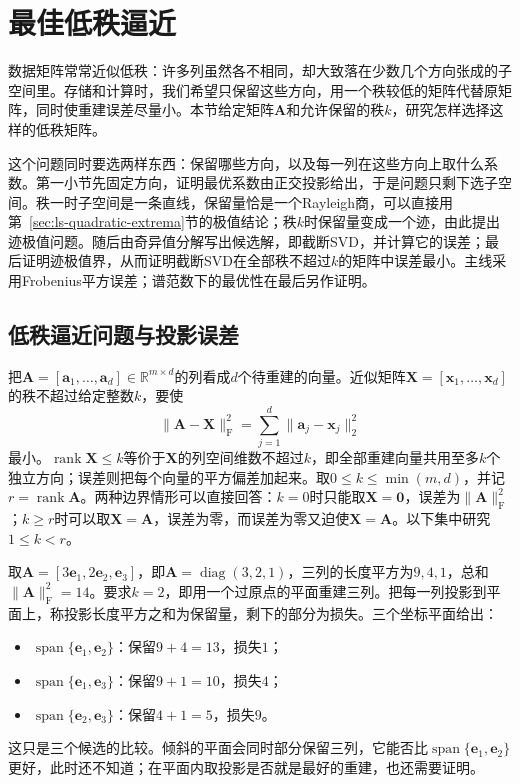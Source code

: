
\section{最佳低秩逼近}
\label{sec:ls-low-rank-approximation}
\label{sec:ls-low-rank-solve}
\label{sec:ls-full-svd-solve}
\label{sec:matrix-analysis-svd-low-rank}

数据矩阵常常近似低秩：许多列虽然各不相同，却大致落在少数几个方向张成的子空间里。存储和计算时，我们希望只保留这些方向，用一个秩较低的矩阵代替原矩阵，同时使重建误差尽量小。本节给定矩阵$\bm A$和允许保留的秩$k$，研究怎样选择这样的低秩矩阵。

这个问题同时要选两样东西：保留哪些方向，以及每一列在这些方向上取什么系数。第一小节先固定方向，证明最优系数由正交投影给出，于是问题只剩下选子空间。秩一时子空间是一条直线，保留量恰是一个Rayleigh商，可以直接用第~\ref{sec:ls-quadratic-extrema}节的极值结论；秩$k$时保留量变成一个迹，由此提出迹极值问题。随后由奇异值分解写出候选解，即截断SVD，并计算它的误差；最后证明迹极值界，从而证明截断SVD在全部秩不超过$k$的矩阵中误差最小。主线采用Frobenius平方误差；谱范数下的最优性在最后另作证明。

\subsection{低秩逼近问题与投影误差}
\label{sec:ls-low-rank-projection-error}

把$\bm A=[\bm a_1,\ldots,\bm a_d]\in\mathbb R^{m\times d}$的列看成$d$个待重建的向量。近似矩阵$\bm X=[\bm x_1,\ldots,\bm x_d]$的秩不超过给定整数$k$，要使
\[
 \lVert\bm A-\bm X\rVert_{\mathrm F}^2=\sum_{j=1}^d\lVert\bm a_j-\bm x_j\rVert_2^2
\]
最小。$\operatorname{rank}\bm X\leq k$等价于$\bm X$的列空间维数不超过$k$，即全部重建向量共用至多$k$个独立方向；误差则把每个向量的平方偏差加起来。取$0\leq k\leq\min(m,d)$，并记$r=\operatorname{rank}\bm A$。两种边界情形可以直接回答：$k=0$时只能取$\bm X=\bm0$，误差为$\lVert\bm A\rVert_{\mathrm F}^2$；$k\geq r$时可以取$\bm X=\bm A$，误差为零，而误差为零又迫使$\bm X=\bm A$。以下集中研究$1\leq k<r$。

\begin{example}[三个坐标向量的重建]
\label{ex:ls-low-rank-three-columns}
取$\bm A=[3\bm e_1,2\bm e_2,\bm e_3]$，即$\bm A=\operatorname{diag}(3,2,1)$，三列的长度平方为$9,4,1$，总和$\lVert\bm A\rVert_{\mathrm F}^2=14$。要求$k=2$，即用一个过原点的平面重建三列。把每一列投影到平面上，称投影长度平方之和为保留量，剩下的部分为损失。三个坐标平面给出：
\begin{itemize}
 \item $\operatorname{span}\{\bm e_1,\bm e_2\}$：保留$9+4=13$，损失$1$；
 \item $\operatorname{span}\{\bm e_1,\bm e_3\}$：保留$9+1=10$，损失$4$；
 \item $\operatorname{span}\{\bm e_2,\bm e_3\}$：保留$4+1=5$，损失$9$。
\end{itemize}
这只是三个候选的比较。倾斜的平面会同时部分保留三列，它能否比$\operatorname{span}\{\bm e_1,\bm e_2\}$更好，此时还不知道；在平面内取投影是否就是最好的重建，也还需要证明。
\end{example}

